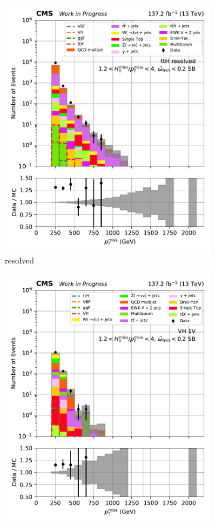 \begin{figure}[htbp]
\begin{subfigure}[b]{0.24\textwidth}
        \includegraphics[width=\textwidth]{figures/region_plots/2016to18/sideband_0/ttH_resolved.pdf}
        \caption{\ttH resolved}
    \end{subfigure}
    \begin{subfigure}[b]{0.24\textwidth}
        \includegraphics[width=\textwidth]{figures/region_plots/2016to18/sideband_0/VH_1V.pdf}

\end{subfigure}
\end{figure}
